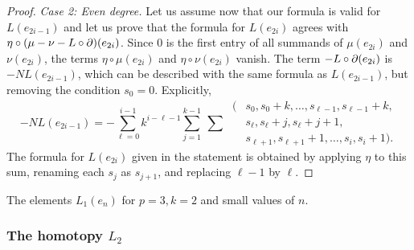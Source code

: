 \begin{proof}
    \medskip\noindent\emph{Case 2: Even degree.}
    Let us assume now that our formula is valid for $L(e_{2i-1})$ and let us prove that the formula for $L(e_{2i})$ agrees with $\eta\circ (\mu - \nu - L\circ \operatorname{\partial})(e_{2i})$.
    Since $0$ is the first entry of all summands of $\mu(e_{2i})$ and $\nu(e_{2i})$, the terms $\eta \circ \mu(e_{2i})$ and $\eta\circ \nu(e_{2i})$ vanish.
    The term $-L\circ \operatorname{\partial}(e_{2i})$ is $-N L(e_{2i-1})$, which can be described with the same formula as $L(e_{2i-1})$, but removing the condition $s_0 = 0$.
    Explicitly,
    \[
   	-N L(e_{2i-1}) = -\sum_{\ell = 0}^{i-1} k^{i-\ell-1} \sum_{j=1}^{k-1} \ \sum \
   	\begin{aligned}
   		\big(&s_0,s_0+k,\ldots,s_{\ell-1},s_{\ell-1}+k, \\
   		&s_{\ell},s_{\ell}+j,s_{\ell}+j+1, \\
   		&s_{\ell+1},s_{\ell+1}+1,\ldots,s_i,s_i+1\big).
   	\end{aligned}
    \]
	The formula for $L(e_{2i})$ given in the statement is obtained by applying $\eta$ to this sum, renaming each $s_j$ as $s_{j+1}$, and replacing $\ell-1$ by $\ell$.
 \end{proof}

\begin{table}
	\centering
	
	\caption{The elements $L_1(e_n)$ for $p=3, k=2$ and small values of $n$.}
	\label{f:small values of L_1}
\end{table}

\subsubsection{The homotopy $L_2$}

